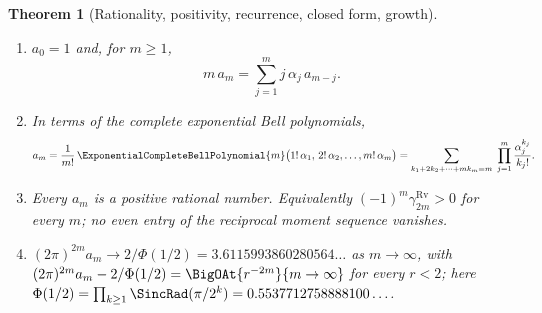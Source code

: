 \documentclass[11pt,oneside]{article}
\theoremstyle{plain}
\newtheorem{theorem}{Theorem}[section]
\theoremstyle{definition}
\theoremstyle{remark}
\newcommand{\PhiUp}{\Phi}                                   %
\newcommand{\am}[1]{a_{#1}}                                 %
\begin{document}
\begin{theorem}[Rationality, positivity, recurrence, closed form, growth]
\label{due:thm:mech-am-rational-positive}
\begin{enumerate}[label=\textup{(\alph*)}]
\item \(\am{0}=1\) and, for \(m\ge1\),
\begin{equation}
 \boxed{\;m\,\am{m}=\sum_{j=1}^{m}j\,\alpha_j\,\am{m-j}.\;}
 \label{due:eq:mech-recurrence}
\end{equation}
\item In terms of the complete exponential Bell polynomials,
\begin{equation}
 \am{m}=\frac1{m!}\,
 \ExponentialCompleteBellPolynomial{m}\bigl(1!\,\alpha_1,\,2!\,\alpha_2,\ldots,m!\,\alpha_m\bigr)
 =\sum_{k_1+2k_2+\cdots+mk_m=m}\;\prod_{j=1}^{m}\frac{\alpha_j^{k_j}}{k_j!}.
 \label{due:eq:mech-bell}
\end{equation}
\item Every \(\am{m}\) is a positive rational number.  Equivalently
\((-1)^{m}\gamma^{\mathrm{Rv}}_{2m}>0\) for every \(m\); no even entry of the
reciprocal moment sequence vanishes.
\item \((2\pi)^{2m}\am{m}\to2/\PhiUp(1/2)=3.6115993860280564\ldots\) as
\(m\to\infty\), with
\((2\pi)^{2m}\am{m}-2/\PhiUp(1/2)=\BigOAt{r^{-2m}}{m\to\infty}\) for every
\(r<2\); here \(\PhiUp(1/2)=\prod_{k\ge1}\SincRad(\pi/2^{k})
=0.5537712758888100\ldots\).
\end{enumerate}
\end{theorem}
\end{document}
